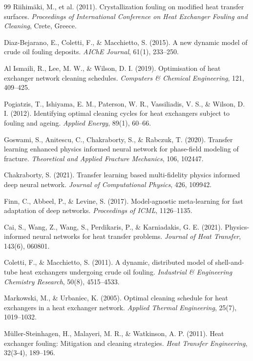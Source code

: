 \documentclass[review]{elsarticle}
\begin{document}
\begin{thebibliography}{99}
Riihim\"aki, M., et al. (2011).
Crystallization fouling on modified heat transfer surfaces.
\textit{Proceedings of International Conference on Heat Exchanger Fouling and Cleaning}, Crete, Greece.

Diaz-Bejarano, E., Coletti, F., \& Macchietto, S. (2015).
A new dynamic model of crude oil fouling deposits.
\textit{AIChE Journal}, 61(1), 233--250.

Al Ismaili, R., Lee, M. W., \& Wilson, D. I. (2019).
Optimisation of heat exchanger network cleaning schedules.
\textit{Computers \& Chemical Engineering}, 121, 409--425.

Pogiatzis, T., Ishiyama, E. M., Paterson, W. R., Vassiliadis, V. S., \& Wilson, D. I. (2012).
Identifying optimal cleaning cycles for heat exchangers subject to fouling and ageing.
\textit{Applied Energy}, 89(1), 60--66.

Goswami, S., Anitescu, C., Chakraborty, S., \& Rabczuk, T. (2020).
Transfer learning enhanced physics informed neural network for phase-field modeling of fracture.
\textit{Theoretical and Applied Fracture Mechanics}, 106, 102447.

Chakraborty, S. (2021).
Transfer learning based multi-fidelity physics informed deep neural network.
\textit{Journal of Computational Physics}, 426, 109942.

Finn, C., Abbeel, P., \& Levine, S. (2017).
Model-agnostic meta-learning for fast adaptation of deep networks.
\textit{Proceedings of ICML}, 1126--1135.

Cai, S., Wang, Z., Wang, S., Perdikaris, P., \& Karniadakis, G. E. (2021).
Physics-informed neural networks for heat transfer problems.
\textit{Journal of Heat Transfer}, 143(6), 060801.

Coletti, F., \& Macchietto, S. (2011).
A dynamic, distributed model of shell-and-tube heat exchangers undergoing crude oil fouling.
\textit{Industrial \& Engineering Chemistry Research}, 50(8), 4515--4533.

Markowski, M., \& Urbaniec, K. (2005).
Optimal cleaning schedule for heat exchangers in a heat exchanger network.
\textit{Applied Thermal Engineering}, 25(7), 1019--1032.

M\"uller-Steinhagen, H., Malayeri, M. R., \& Watkinson, A. P. (2011).
Heat exchanger fouling: Mitigation and cleaning strategies.
\textit{Heat Transfer Engineering}, 32(3-4), 189--196.


\end{thebibliography}
\end{document}
